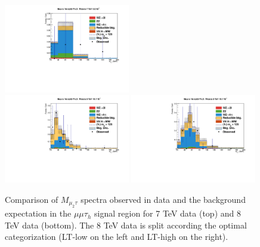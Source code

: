 \begin{figure}
\begin{center}
  \includegraphics[width=0.49\textwidth]{4_Analisys/pics/7TeV/plots/mmt/LTCut/final-subMass-LTCut.pdf}\\
  \includegraphics[width=0.49\textwidth]{4_Analisys/pics/8TeV/plots/mmt/LTLow/final-subMass-LTLow.pdf}
  \includegraphics[width=0.49\textwidth]{4_Analisys/pics/8TeV/plots/mmt/LTHigh/final-subMass-LTHigh.pdf}\\
  \caption{
  Comparison of $M_{\mu_2\tau}$ spectra observed in data and the background expectation %
  in the $\mu\mu\tau_h$ signal region for 7 TeV data (top) and 8 TeV data (bottom). The 8 TeV data is split according the optimal categorization (LT-low on the left and LT-high on the right).
  }
  \label{fig:LLT_mmt_prefit}
\end{center}
\end{figure}

